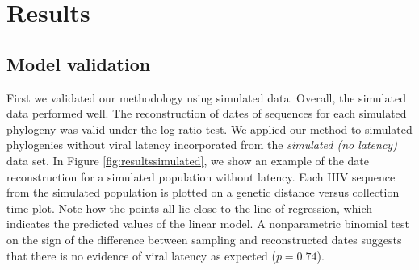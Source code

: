 \documentclass{bmcart}
\begin{document}



\section * {Results} \label{sec:results}


\subsection * {Model validation} \label{sec:simresults}
First we validated our methodology using simulated data.
Overall, the simulated data performed well. The reconstruction of dates of sequences for each simulated phylogeny was valid under the log ratio test.
We applied our method to simulated phylogenies without viral latency incorporated from the \emph{simulated (no latency)} data set.
In Figure \ref{fig:resultssimulated}, we show an example of the date reconstruction for a simulated population without latency.
Each HIV sequence from the simulated population is plotted on a genetic distance versus collection time plot.
Note how the points all lie close to the line of regression, which indicates the predicted values of the linear model.
A nonparametric binomial test on the sign of the difference between sampling and reconstructed dates suggests that there is no evidence of viral latency as expected ($p = 0.74$).
\end{document}
